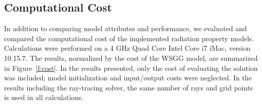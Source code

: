 \documentclass[preprint,12pt]{elsarticle}
\begin{document}

    \subsection{Computational Cost} \label{s:cost}

    In addition to comparing model attributes and performance, we evaluated and compared the computational cost of the implemented radiation property models.
    Calculations were performed on a 4 GHz Quad Core Intel Core i7 iMac, version 10.15.7. The results, normalized by the cost of the WSGG model, are summarized in Figure~\ref{f:cost}.
    In the results presented, only the cost of evaluating the solution was included; model initialization and input/output costs were neglected. In the results including the ray-tracing solver, the same number of rays and grid points is used in all calculations.
\end{document}
